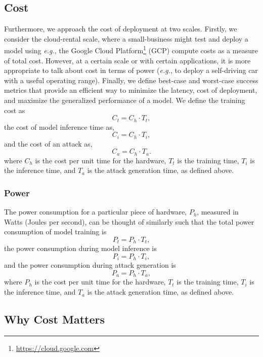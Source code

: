 \documentclass[conference]{IEEEtran}
\begin{document}
\subsection{Cost}

Furthermore, we approach the cost of deployment at two scales. Firstly, we consider the cloud-rental scale, where a small-business might test and deploy a model using \textit{e.g.}, the Google Cloud Platform\footnote{\href{https://cloud.google.com}{https://cloud.google.com}} (GCP) compute costs as a measure of total cost. However, at a certain scale or with certain applications, it is  more appropriate to talk about cost in terms of power (\textit{e.g.}, to deploy a self-driving car with a useful operating range). Finally, we define best-case and worst-case success metrics that provide an efficient way to minimize the latency, cost of deployment, and 
maximize the generalized performance of a model. We define the training cost as
$$
    C_t = C_h \cdot T_t,
$$
the cost of model inference time as,
$$
    C_i = C_h \cdot T_i,
$$
and the cost of an attack as,
$$
    C_a = C_h \cdot T_a.
$$
where $C_h$ is the cost per unit time for the hardware, $T_t$ is the training time, $T_i$ is the inference time, and $T_a$ is the attack generation time, as defined above.


\subsubsection{Power}

The power consumption for a particular piece of hardware, $P_h$, measured in Watts (Joules per second), can be thought of similarly such that the total power consumption of model training is
$$
    P_t = P_h \cdot T_t,
    \label{eq:power_training}
$$
the power consumption during model inference is
$$
    P_i = P_h \cdot T_i,
    \label{eq:power_inference}
$$
and the power consumption during attack generation is
$$
    P_a = P_h \cdot T_a,
    \label{eq:power_attack}
$$
where $P_h$ is the cost per unit time for the hardware, $T_t$ is the training time, $T_i$ is the inference time, and $T_a$ is the attack generation time, as defined above.


\subsection{Why Cost Matters}
\end{document}
